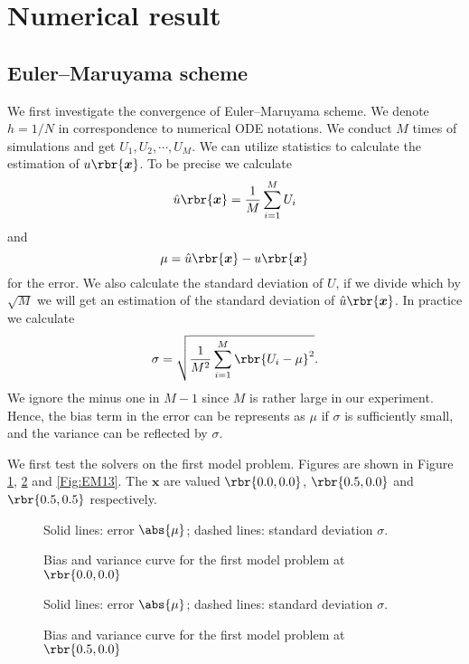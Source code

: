 \documentclass[english, nochinese]{pnote}
\begin{document}
\section{Numerical result}

\subsection{Euler--Maruyama scheme}

We first investigate the convergence of Euler--Maruyama scheme. We denote $ h = 1 / N $ in correspondence to numerical ODE notations. We conduct $M$ times of simulations and get $ U_1, U_2, \cdots, U_M $. We can utilize statistics to calculate the estimation of $ u \rbr{\bm{x}} $. To be precise we calculate
\begin{equation}
\hat{u} \rbr{\bm{x}} = \frac{1}{M} \sum_{ i = 1 }^M U_i
\end{equation}
and
\begin{equation}
\mu = \hat{u} \rbr{\bm{x}} - u \rbr{\bm{x}}
\end{equation}
for the error. We also calculate the standard deviation of $U$, if we divide which by $\sqrt{M}$ we will get an estimation of the standard deviation of $ \hat{u} \rbr{\bm{x}} $. In practice we calculate
\begin{equation}
\sigma = \sqrt{\frac{1}{M^2} \sum_{ i = 1 }^M \rbr{ U_i - \mu }^2 }.
\end{equation}
We ignore the minus one in $ M - 1 $ since $M$ is rather large in our experiment. Hence, the bias term in the error can be represents as $\mu$ if $\sigma$ is sufficiently small, and the variance can be reflected by $\sigma$.

We first test the solvers on the first model problem. Figures are shown in Figure \ref{Fig:EM11}, \ref{Fig:EM12} and \ref{Fig:EM13}. The $\bm{x}$ are valued $ \rbr{ 0.0, 0.0 } $, $ \rbr{ 0.5, 0.0 } $ and $ \rbr{ 0.5, 0.5 } $ respectively.

\begin{figure}[htbp]
{
\centering

\caption{Bias and variance curve for the first model problem at $ \rbr{ 0.0, 0.0 } $}
\label{Fig:EM11}
}
{
\footnotesize Solid lines: error $\abs{\mu}$; dashed lines: standard deviation $\sigma$.
}
\end{figure}

\begin{figure}[htbp]
{
\centering

\caption{Bias and variance curve for the first model problem at $ \rbr{ 0.5, 0.0 } $}
\label{Fig:EM12}
}
{
\footnotesize Solid lines: error $\abs{\mu}$; dashed lines: standard deviation $\sigma$.
}
\end{figure}
\end{document}
